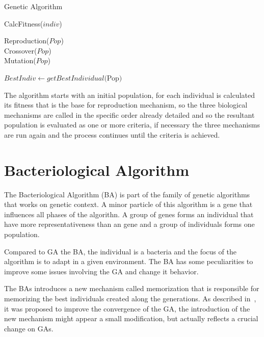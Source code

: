 \begin{algorithm}
		\caption{Genetic Algorithm\label{alg:ga}}


		 {
			 {
				CalcFitness($indiv$)
			}

			Reproduction($Pop$)\\
			Crossover($Pop$)\\
			Mutation($Pop$)				

		}

		$BestIndiv \leftarrow getBestIndividual($Pop$)$
		
\end{algorithm}

The algorithm starts with an initial population, for each individual is calculated
its fitness that is the base for reproduction mechanism, so the three biological
mechanisms are called in the specific order already detailed and so the resultant
population is evaluated as one or more criteria, if necessary the three mechanisms
are run again and the process continues until the criteria is achieved.

\section{Bacteriological Algorithm}

The Bacteriological Algorithm (BA) 
is part of the family of genetic algorithms that
works on genetic context. A minor particle of this algorithm is a gene that influences
all phases of the algorithn. A group of genes forms an individual that have more
representativeness than an gene and a group of individuals forms one population.

Compared to GA the BA, the individual is a bacteria and the focus of the algorithm
is to adapt in a given environment.
The BA has some peculiarities to improve some issues involving the GA and change
it behavior.

The BAs introduces a new mechanism called memorization that is responsible for memorizing
the best individuals created along the generations. As described in~\cite{baudry},
it was proposed to improve the convergence of the GA, the introduction of the new
mechanism might appear a small modification, but actually reflects a crucial
change on GAs.

